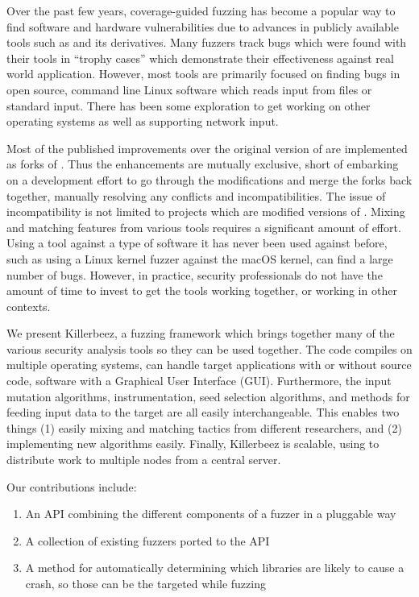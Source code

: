 Over the past few years, coverage-guided fuzzing has become a popular way to
find software and hardware vulnerabilities due to advances in publicly
available tools such as \AFL{}\cite{afl} and its derivatives.\cite{vanhauser} Many
fuzzers track bugs which were found with their tools in ``trophy cases'' which
demonstrate their effectiveness against real world application.  However, most
tools are primarily focused on finding bugs in open source, command line Linux
software which reads input from files or standard input. There has been some
exploration to get \AFL{} working on other operating
systems\cite{aflosx}\cite{winafl} as well as supporting network
input.\cite{netafl}\cite{preeny}

Most of the published improvements over the original version of \AFL{} are
implemented as forks of
\AFL{}.\cite{aflfast}\cite{aflgo}\cite{fairfuzz}\cite{perffuzz}\cite{pythia}\cite{collafl}
Thus the enhancements are mutually exclusive, short of embarking on a
development effort to go through the modifications and merge the forks back
together, manually resolving any conflicts and incompatibilities.  The issue
of incompatibility is not limited to projects which are modified versions of
\AFL{}. Mixing and matching features from various tools requires a significant
amount of effort. Using a tool against a type of software it has never been
used against before, such as using a Linux kernel fuzzer against the macOS
kernel, can find a large number of bugs.  However, in practice, security
professionals do not have the amount of time to invest to get the tools working
together, or working in other contexts.

We present Killerbeez, a fuzzing framework which brings together many of the
various security analysis tools so they can be used together.  The code
compiles on multiple operating systems, can handle target applications with or
without source code, software with a Graphical User Interface (GUI).
Furthermore, the input mutation algorithms, instrumentation, seed selection
algorithms, and methods for feeding input data to the target are all easily
interchangeable.  This enables two things (1) easily mixing and matching
tactics from different researchers, and (2) implementing new algorithms easily.
Finally, Killerbeez is scalable, using \BOINC{}\cite{boinc} to distribute work
to multiple nodes from a central server.

Our contributions include:
\begin{enumerate}[noitemsep]
\item An API combining the different components of a fuzzer in a pluggable way
\item A collection of existing fuzzers ported to the API
\item A method for automatically determining which libraries are likely to
	cause a crash, so those can be the targeted while fuzzing
\end{enumerate}
